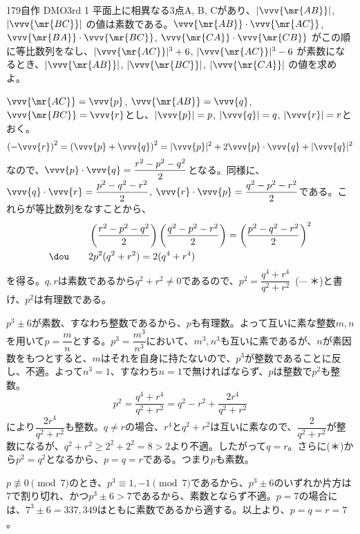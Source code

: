 \begin{thm}{179}{}{自作 DMO3rd 1}
 平面上に相異なる3点A, B, Cがあり、$|\vvv{\mr{AB}}|$, $|\vvv{\mr{BC}}|$ の値は素数である。$\vvv{\mr{AB}}\cdot\vvv{\mr{AC}}$, $\vvv{\mr{BA}}\cdot\vvv{\mr{BC}}$, $\vvv{\mr{CA}}\cdot\vvv{\mr{CB}}$ がこの順に等比数列をなし、$|\vvv{\mr{AC}}|^3+6$, $|\vvv{\mr{AC}}|^3-6$ が素数になるとき、$|\vvv{\mr{AB}}|$, $|\vvv{\mr{BC}}|$, $|\vvv{\mr{CA}}|$ の値を求めよ。
\end{thm}

$\vvv{\mr{AC}}=\vvv{p}$, $\vvv{\mr{AB}}=\vvv{q}$, $\vvv{\mr{BC}}=\vvv{r}$とし、$|\vvv{p}|=p$, $|\vvv{q}|=q$, $|\vvv{r}|=r$とおく。
\[ \left(-\vvv{r}\right)^2=\left(\vvv{p}+\vvv{q}\right)^2=|\vvv{p}|^2+2\vvv{p}\cdot\vvv{q}+|\vvv{q}|^2 \]
なので、$\vvv{p}\cdot\vvv{q}=\dfrac{r^2-p^2-q^2}{2}$となる。同様に、$\vvv{q}\cdot\vvv{r}=\dfrac{p^2-q^2-r^2}{2}$, $\vvv{r}\cdot\vvv{p}=\dfrac{q^2-p^2-r^2}{2}$である。これらが等比数列をなすことから、
\begin{align*}
 & \left(\frac{r^2-p^2-q^2}{2}\right) \left(\frac{q^2-p^2-r^2}{2}\right)=\left(\frac{p^2-q^2-r^2}{2}\right)^2 \\
 \dou \qquad &2p^2(q^2+r^2)=2(q^4+r^4)
\end{align*}
を得る。$q, r$は素数であるから$q^2+r^2\neq 0$であるので、$p^2=\dfrac{q^4+r^4}{q^2+r^2}$~($\cdots$ ＊)と書け、$p^2$は有理数である。

$p^3\pm 6$が素数、すなわち整数であるから、$p$も有理数。よって互いに素な整数$m, n$を用いて$p=\dfrac{m}{n}$とする。$p^3=\dfrac{m^3}{n^3}$において、$m^3, n^3$も互いに素であるが、$n$が素因数をもつとすると、$m$はそれを自身に持たないので、$p^3$が整数であることに反し、不適。よって$n^3=1$、すなわち$n=1$で無ければならず、$p$は整数で$p^2$も整数。
\[ p^2=\frac{q^4+r^4}{q^2+r^2}=q^2-r^2+\frac{2r^4}{q^2+r^2} \]
により$\dfrac{2r^4}{q^2+r^2}$も整数。$q\neq r$の場合、$r^4$と$q^2+r^2$は互いに素なので、$\dfrac{2}{q^2+r^2}$が整数になるが、$q^2+r^2\ge 2^2+2^2=8>2$より不適。したがって$q=r$。さらに(＊)から$p^2=q^2$となるから、$p=q=r$である。つまり$p$も素数。

$p \not\equiv 0 \pmod{7}$のとき、$p^3\equiv 1, -1 \pmod{7}$であるから、$p^3\pm 6$のいずれか片方は7で割り切れ、かつ$p^3\pm 6 >7$であるから、素数とならず不適。$p=7$の場合には、$7^3\pm6=337, 349$はともに素数であるから適する。以上より、$p=q=r=7$。